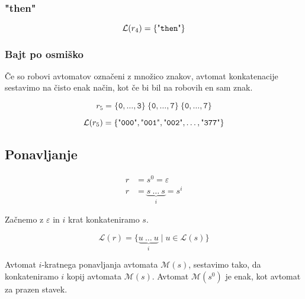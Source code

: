 \documentclass{article}
\newcommand{\Null}{\varepsilon}
\newcommand{\Language}[1]{\mathcal{L}(#1)}
\newcommand{\Automaton}[1]{\mathcal{M}(#1)}
\newcommand{\Str}[1]{\text{\textquotedbl\texttt{#1}\textquotedbl}}
\newcommand{\Char}[1]{\texttt{#1}}
\newcommand{\Seq}{\ }
\newcommand{\Rep}[2]{#1^#2}
\begin{document}
\subsubsection{"then"}
\begin{equation*}
  \Language{r_4} = \{ \Str{then} \}
\end{equation*}

\subsubsection{Bajt po osmiško}
Če so robovi avtomatov označeni z množico znakov, avtomat konkatenacije sestavimo na čisto enak način, kot če bi bil na robovih en sam znak.

\begin{equation*}
  r_5 = \{\Char{0}, \dots, \Char{3}\} \Seq \{\Char{0}, \dots, \Char{7}\} \Seq \{\Char{0}, \dots, \Char{7}\}
\end{equation*}

\begin{equation*}
  \Language{r_5} = \{ \Str{000}, \Str{001}, \Str{002}, \dots, \Str{377} \}
\end{equation*}

\subsection{Ponavljanje}

\begin{align*}
  r &= \Rep{s}{0} = \Null\\
  r &= \underbrace{s \Seq \ldots \Seq s}_{i} = \Rep{s}{i}
\end{align*}

Začnemo z $\Null$ in $i$ krat konkateniramo $s$.

\begin{equation*}
  \Language{r} = \{ \underbrace{u \Seq \ldots \Seq u}_{i} \mid u \in \Language{s}\}
\end{equation*}

Avtomat $i$-kratnega ponavljanja avtomata $\Automaton{s}$, sestavimo tako, da konkateniramo $i$ kopij avtomata $\Automaton{s}$.
Avtomat $\Automaton{s^0}$ je enak, kot avtomat za prazen stavek.
\end{document}
